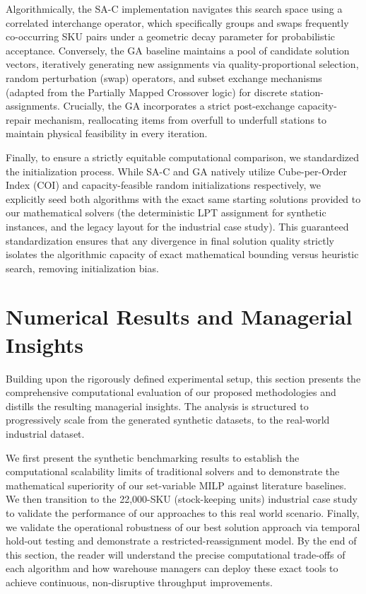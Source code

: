 \documentclass[preprint,review,11pt,authoryear]{elsarticle}
\begin{document}
Algorithmically, the SA-C implementation navigates this search space using a correlated interchange operator, which specifically groups and swaps frequently co-occurring SKU pairs under a geometric decay parameter for probabilistic acceptance. Conversely, the GA baseline maintains a pool of candidate solution vectors, iteratively generating new assignments via quality-proportional selection, random perturbation (swap) operators, and subset exchange mechanisms (adapted from the Partially Mapped Crossover logic) for discrete station-assignments. Crucially, the GA incorporates a strict post-exchange capacity-repair mechanism, reallocating items from overfull to underfull stations to maintain physical feasibility in every iteration.

Finally, to ensure a strictly equitable computational comparison, we standardized the initialization process. While SA-C and GA natively utilize Cube-per-Order Index (COI) and capacity-feasible random initializations respectively, we explicitly seed both algorithms with the exact same starting solutions provided to our mathematical solvers (the deterministic LPT assignment for synthetic instances, and the legacy layout for the industrial case study). This guaranteed standardization ensures that any divergence in final solution quality strictly isolates the algorithmic capacity of exact mathematical bounding versus heuristic search, removing initialization bias.


\section{Numerical Results and Managerial Insights}
\label{sec:numerical_results}

Building upon the rigorously defined experimental setup, this section presents the comprehensive computational evaluation of our proposed methodologies and distills the resulting managerial insights. The analysis is structured to progressively scale from the generated synthetic datasets, to the real-world industrial dataset. 

We first present the synthetic benchmarking results to establish the computational scalability limits of traditional solvers and to demonstrate the mathematical superiority of our set-variable MILP against literature baselines. We then transition to the 22,000-SKU (stock-keeping units) industrial case study to validate the performance of our approaches to this real world scenario. Finally, we validate the operational robustness of our best solution approach via temporal hold-out testing and demonstrate a restricted-reassignment model. By the end of this section, the reader will understand the precise computational trade-offs of each algorithm and how warehouse managers can deploy these exact tools to achieve continuous, non-disruptive throughput improvements.
\end{document}
